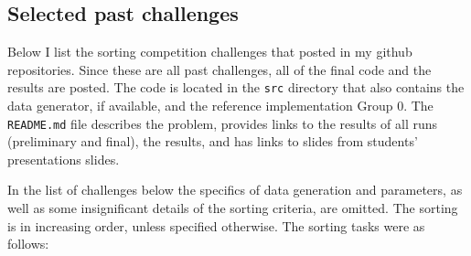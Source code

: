 \documentclass[12pt]{article}
\newcommand{\comment}[1]{}
\newcommand{\emcomment}[1]{\textcolor{ForestGreen}{\comment{Elena: {#1}}}}
\begin{document}
\subsection{Selected past challenges}\label{subsec:list}
Below I list the sorting competition challenges that posted in my github repositories. Since these are all past challenges, all of the final code and the results are posted. The code is located in the \texttt{src} directory that also contains the data generator, if available, and the reference implementation Group 0. 
The \texttt{README.md} file describes the problem, provides links to the results of all runs (preliminary and final), the results, and has links to slides from students' presentations slides. 

In the list of challenges below the specifics of data generation and parameters, as well as some insignificant details of the sorting criteria, are omitted. The sorting is in increasing order, unless specified otherwise. The sorting tasks were as follows:
\end{document}
